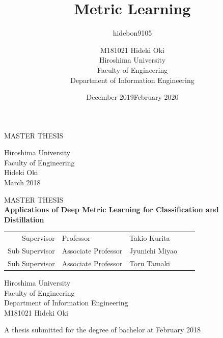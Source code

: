 \documentclass[a4paper,12pt]{article}
\author{hidebon9105 }
\date{December 2019}
\begin{document}
\begin{center}
\vspace*{20truept}
{\large MASTER THESIS} \\
\vspace{260truept}

Hiroshima University \\
Faculty of Engineering\\
\vspace{30truept}
{\Large Hideki Oki}\\
\vspace{30truept}
March 2018
\end{center}
\thispagestyle{empty}

\newpage

\begin{titlepage}
\title{Metric Learning}


\begin{center}
\vspace*{20truept}
{\large MASTER THESIS} \\
\vspace{30truept}
{\bf \Large Applications of Deep Metric Learning for Classification and Distillation}

\vspace*{30truept}
\begin{tabular}{rllrl}
Supervisor & Professor & Takio Kurita \\
Sub Supervisor & Associate Professor & Jyunichi Miyao \\
Sub Supervisor & Associate Professor & Toru Tamaki
\end{tabular}
\vspace{100truept}

Hiroshima University \\
Faculty of Engineering\\
Department of Information Engineering\\
\vspace{35truept}
{\Large M181021 Hideki Oki} \\

\vspace{35truept}

A thesis submitted for the degree of bachelor at February 2018



\end{center}

\author{M181021 Hideki Oki \\
Hiroshima University \\
Faculty of Engineering\\
Department of Information Engineering}
\date{February 2020}

\end{titlepage}
\thispagestyle{empty}
\clearpage
\begin{abstract}

\end{abstract}
\newpage
\thispagestyle{empty}
\end{document}
